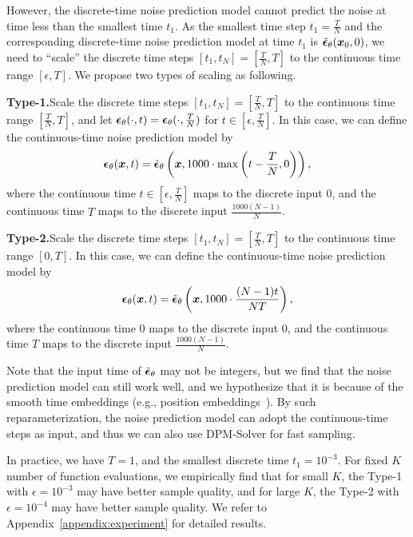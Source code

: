 However, the discrete-time noise prediction model cannot predict the noise at time less than the smallest time $t_1$. As the smallest time step $t_1=\frac{T}{N}$ and the corresponding discrete-time noise prediction model at time $t_1$ is $\tilde{\bm{\epsilon}}_\theta(\bm{x}_0, 0)$, we need to ``scale'' the discrete time steps $[t_1, t_N]=[\frac{T}{N}, T]$ to the continuous time range $[\epsilon, T]$. We propose two types of scaling as following.

\textbf{Type-1.}\quad Scale the discrete time steps $[t_1, t_N]=[\frac{T}{N}, T]$ to the continuous time range $[\frac{T}{N}, T]$, and let $\bm{\epsilon}_\theta(\cdot, t)=\bm{\epsilon}_\theta(\cdot, \frac{T}{N})$ for $t\in[\epsilon, \frac{T}{N}]$. In this case, we can define the continuous-time noise prediction model by
\begin{equation}
    \bm{\epsilon}_\theta(\bm{x}, t) = \tilde{\bm{\epsilon}}_\theta\left(\bm{x}, 1000 \cdot \max\left(t - \frac{T}{N}, 0\right)\right),
\end{equation}
where the continuous time $t\in [\epsilon, \frac{T}{N}]$ maps to the discrete input $0$, and the continuous time $T$ maps to the discrete input $\frac{1000(N-1)}{N}$.

\textbf{Type-2.}\quad Scale the discrete time steps $[t_1, t_N]=[\frac{T}{N}, T]$ to the continuous time range $[0, T]$. In this case, we can define the continuous-time noise prediction model by
\begin{equation}
    \bm{\epsilon}_\theta(\bm{x}, t) = \tilde{\bm{\epsilon}}_\theta\left(\bm{x}, 1000 \cdot \frac{(N-1)t}{NT}\right),
\end{equation}
where the continuous time $0$ maps to the discrete input $0$, and the continuous time $T$ maps to the discrete input $\frac{1000(N-1)}{N}$.

Note that the input time of $\tilde{\bm{\epsilon}}_\theta$ may not be integers, but we find that the noise prediction model can still work well, and we hypothesize that it is because of the smooth time embeddings (e.g., position embeddings~\citep{ho2020denoising}). By such reparameterization, the noise prediction model can adopt the continuous-time steps as input, and thus we can also use DPM-Solver for fast sampling.

In practice, we have $T=1$, and the smallest discrete time $t_1=10^{-3}$. For fixed $K$ number of function evaluations, we empirically find that for small $K$, the Type-1 with $\epsilon=10^{-3}$ may have better sample quality, and for large $K$, the Type-2 with $\epsilon=10^{-4}$ may have better sample quality. We refer to Appendix~\ref{appendix:experiment} for detailed results.


